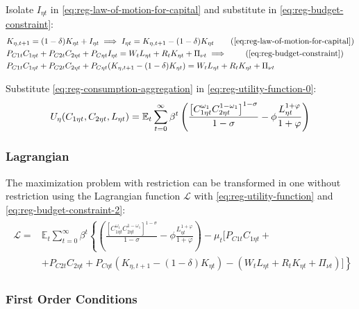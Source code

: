 \documentclass[
	thesis.tex
	]{subfiles}
\begin{document}
Isolate $I_{\eta t}$ in \ref{eq:reg-law-of-motion-for-capital} and substitute in \ref{eq:reg-budget-constraint}:
\begin{align}
	& K_{\eta, t+1} = (1-\delta)K_{\eta t} + I_{\eta t} \implies I_{\eta t} = K_{\eta, t+1} - (1-\delta)K_{\eta t} \tag{\ref{eq:reg-law-of-motion-for-capital}} \\
	& P_{C1t} C_{1\eta t} + P_{C2t} C_{2\eta t} + P_{C\eta t} I_{\eta t} = W_t L_{\eta t} + R_t K_{\eta t} + \Pi_{\nu t} \implies \tag{\ref{eq:reg-budget-constraint}} \\
	& P_{C1t} C_{1\eta t} + P_{C2t} C_{2\eta t} + P_{C\eta t} (K_{\eta, t+1} - (1-\delta)K_{\eta t}) = W_t L_{\eta t} + R_t K_{\eta t} + \Pi_{\nu t} \label{eq:reg-budget-constraint-2}
\end{align}

Substitute \ref{eq:reg-consumption-aggregation} in \ref{eq:reg-utility-function-0}:
\begin{align}
	U_{\eta}(C_{1\eta t}, C_{2\eta t}, L_{\eta t}) = {\mathbb{E}_{t}} \sum_{t=0}^{\infty} \beta^t \left( \frac{\left[ C_{1\eta t}^{\omega_1} C_{2\eta t}^{1-\omega_1} \right]^{1-\sigma}}{1-\sigma} - \phi \frac{L_{\eta t}^{1+\varphi}}{1+\varphi} \right) \label{eq:reg-utility-function}
\end{align}

\subsubsection*{Lagrangian}

The maximization problem with restriction can be transformed in one without restriction using the Lagrangian function $\mathcal{L}$ with \ref{eq:reg-utility-function} and \ref{eq:reg-budget-constraint-2}:
\begin{align}
	\begin{split}
		\mathcal{L} = &\mathbb{E}_t \sum_{t=0}^{\infty} \beta^t \left\{ \left( \frac{ \left[ C_{1\eta t}^{\omega_1} C_{2\eta t}^{1-\omega_1} \right]^{1-\sigma}}{1-\sigma} - \phi \frac{L_{\eta t}^{1+\varphi}}{1+\varphi} \right) - \mu_t \Big[ P_{C1t} C_{1\eta t} + \right. \\ & \left. + P_{C2t} C_{2\eta t} + P_{C\eta t} (K_{\eta, t+1} - (1-\delta)K_{\eta t}) -(W_t L_{\eta t} + R_t K_{\eta t} + \Pi_{\nu t}) \Big] \right\} \label{eq:reg-household-lagrangian}
	\end{split}
\end{align}


\subsubsection*{First Order Conditions}
\end{document}
